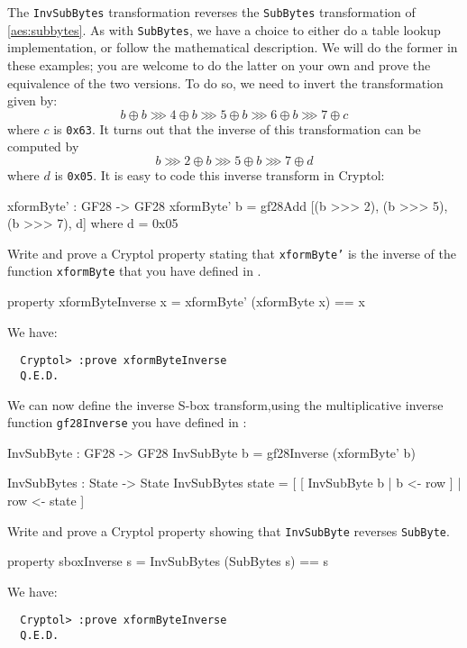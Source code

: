 The {\tt InvSubBytes} transformation reverses the {\tt SubBytes}
transformation of \autoref{aes:subbytes}. As with {\tt SubBytes},
we have a choice to either do a table lookup implementation, or follow
the mathematical description.  We will do the former in these examples;
you are welcome to do the latter on your own and prove the equivalence
of the two versions.  To do so, we need to invert the transformation
given by:
$$
 b \oplus b \ggg 4 \oplus b \ggg 5 \oplus b \ggg 6 \oplus b \ggg 7 \oplus c
$$
where $c$ is {\tt 0x63}. It turns out that the inverse of this
transformation can be computed by
$$
 b \ggg 2 \oplus b \ggg 5 \oplus b \ggg 7 \oplus d
$$
where $d$ is {\tt 0x05}.  It is easy to code this inverse transform in
Cryptol:

\begin{code}
  xformByte' : GF28 -> GF28
  xformByte' b = gf28Add [(b >>> 2), (b >>> 5), (b >>> 7), d]
    where d = 0x05
\end{code}

\begin{Exercise}\label{ex:invsb:1}
  Write and prove a Cryptol property stating that {\tt xformByte'} is
  the inverse of the function {\tt xformByte} that you have defined in
  .
\end{Exercise}
\begin{Answer}
\begin{code}
  property xformByteInverse x = xformByte' (xformByte x) == x
\end{code}
We have:
\begin{Verbatim}
  Cryptol> :prove xformByteInverse
  Q.E.D.
\end{Verbatim}
\end{Answer}

\unparagraph We can now define the inverse S-box
transform,\indAESInvSbox using the multiplicative inverse function
{\tt gf28Inverse} you have defined in
:
\begin{code}
  InvSubByte : GF28 -> GF28
  InvSubByte b = gf28Inverse (xformByte' b)

  InvSubBytes : State -> State
  InvSubBytes state = [ [ InvSubByte b | b <- row ] 
                      | row <- state
                      ]
\end{code}

\begin{Exercise}\label{ex:invsb:2}
  Write and prove a Cryptol property showing that {\tt InvSubByte}
  reverses {\tt SubByte}.\indAESSbox
\end{Exercise}
\begin{Answer}
\begin{code}
  property sboxInverse s = InvSubBytes (SubBytes s) == s
\end{code}
We have:
\begin{Verbatim}
  Cryptol> :prove xformByteInverse
  Q.E.D.
\end{Verbatim}
\end{Answer}

